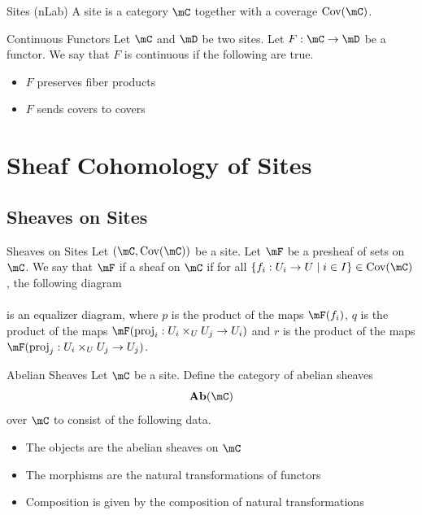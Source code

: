 \documentclass[a4paper]{article}
\begin{document}
\begin{defn}{Sites (nLab)}{} A site is a category $\mC$ together with a coverage $\text{Cov}(\mC)$. 
\end{defn}

\begin{defn}{Continuous Functors}{} Let $\mC$ and $\mD$ be two sites. Let $F:\mC\to\mD$ be a functor. We say that $F$ is continuous if the following are true. 
\begin{itemize}
\item $F$ preserves fiber products
\item $F$ sends covers to covers
\end{itemize}
\end{defn}

\pagebreak
\section{Sheaf Cohomology of Sites}
\subsection{Sheaves on Sites}
\begin{defn}{Sheaves on Sites}{} Let $(\mC,\text{Cov}(\mC))$ be a site. Let $\mF$ be a presheaf of sets on $\mC$. We say that $\mF$ if a sheaf on $\mC$ if for all $\{f_i:U_i\to U\;|\;i\in I\}\in\text{Cov}(\mC)$, the following diagram \\
\\
is an equalizer diagram, where $p$ is the product of the maps $\mF(f_i)$, $q$ is the product of the maps $\mF(\text{proj}_i:U_i\times_UU_j\to U_i)$ and $r$ is the product of the maps $\mF(\text{proj}_j:U_i\times_UU_j\to U_j)$. 
\end{defn}

\begin{defn}{Abelian Sheaves}{} Let $\mC$ be a site. Define the category of abelian sheaves $$\bold{Ab}(\mC)$$ over $\mC$ to consist of the following data. 
\begin{itemize}
\item The objects are the abelian sheaves on $\mC$
\item The morphisms are the natural transformations of functors
\item Composition is given by the composition of natural transformations
\end{itemize}
\end{defn}
\end{document}
